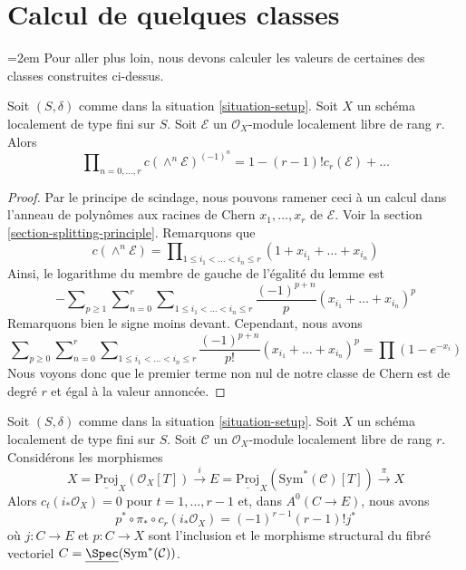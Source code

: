 \section{Calcul de quelques classes}
\label{section-calculate}

{\emergencystretch=2em\noindent
Pour aller plus loin, nous devons calculer les valeurs de certaines des
classes construites ci-dessus.\par}

\begin{lemma}
\label{lemma-compute-koszul}
Soit $(S, \delta)$ comme dans la situation \ref{situation-setup}. Soit $X$
un schéma localement de type fini sur $S$. Soit $\mathcal{E}$
un $\mathcal{O}_X$-module localement libre de rang $r$.
Alors
$$
\prod\nolimits_{n = 0, \ldots, r} c(\wedge^n \mathcal{E})^{(-1)^n} =
1 - (r - 1)! c_r(\mathcal{E}) + \ldots
$$
\end{lemma}

\begin{proof}
Par le principe de scindage, nous pouvons ramener ceci à un calcul dans
l'anneau de polynômes aux racines de Chern $x_1, \ldots, x_r$ de $\mathcal{E}$. Voir la
section \ref{section-splitting-principle}. Remarquons que
$$
c(\wedge^n \mathcal{E}) =
\prod\nolimits_{1 \leq i_1 < \ldots < i_n \leq r}
(1 + x_{i_1} + \ldots + x_{i_n})
$$
Ainsi, le logarithme du membre de gauche de l'égalité du lemme est
$$
-
\sum\nolimits_{p \geq 1}
\sum\nolimits_{n = 0}^r
\sum\nolimits_{1 \leq i_1 < \ldots < i_n \leq r}
\frac{(-1)^{p + n}}{p}(x_{i_1} + \ldots + x_{i_n})^p
$$
Remarquons bien le signe moins devant. Cependant, nous avons
$$
\sum\nolimits_{p \geq 0}
\sum\nolimits_{n = 0}^r
\sum\nolimits_{1 \leq i_1 < \ldots < i_n \leq r}
\frac{(-1)^{p + n}}{p!}(x_{i_1} + \ldots + x_{i_n})^p
=
\prod (1 - e^{-x_i})
$$
Nous voyons donc que le premier terme non nul de notre classe de Chern
est de degré $r$ et égal à la valeur annoncée.
\end{proof}

\begin{lemma}
\label{lemma-compute-section}
Soit $(S, \delta)$ comme dans la situation \ref{situation-setup}. Soit $X$
un schéma localement de type fini sur $S$. Soit $\mathcal{C}$
un $\mathcal{O}_X$-module localement libre de rang $r$. Considérons les
morphismes
$$
X = \underline{\text{Proj}}_X(\mathcal{O}_X[T])
\xrightarrow{i}
E = \underline{\text{Proj}}_X(\text{Sym}^*(\mathcal{C})[T])
\xrightarrow{\pi}
X
$$
Alors $c_t(i_*\mathcal{O}_X) = 0$ pour $t = 1, \ldots, r - 1$ et, dans
$A^0(C \to E)$, nous avons
$$
p^* \circ \pi_* \circ c_r(i_*\mathcal{O}_X) = (-1)^{r - 1}(r - 1)! j^*
$$
où
$j : C \to E$ et $p : C \to X$ sont l'inclusion et le morphisme
structural du fibré vectoriel
$C = \underline{\Spec}(\text{Sym}^*(\mathcal{C}))$.
\end{lemma}

